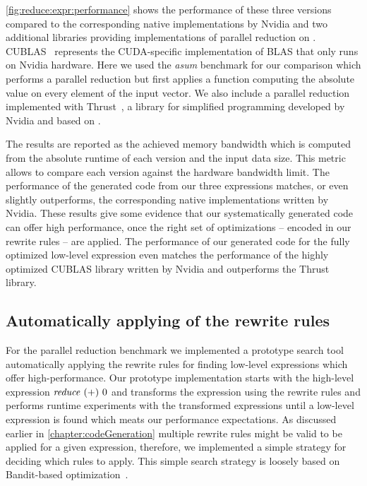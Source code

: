 \autoref{fig:reduce:expr:performance} shows the performance of these three versions compared to the corresponding native \OpenCL implementations by Nvidia and two additional libraries providing implementations of parallel reduction on \GPUs.
CUBLAS~\cite{cuBLAS} represents the CUDA-specific implementation of BLAS that only runs on Nvidia hardware.
Here we used the \emph{asum} benchmark for our comparison which performs a parallel reduction but first applies a function computing the absolute value on every element of the input vector.
We also include a parallel reduction implemented with Thrust~\cite{BellHo2011}, a library for simplified \GPU programming developed by Nvidia and based on \CUDA.

The results are reported as the achieved memory bandwidth which is computed from the absolute runtime of each version and the input data size.
This metric allows to compare each version against the hardware bandwidth limit.
The performance of the generated \OpenCL code from our three expressions matches, or even slightly outperforms, the corresponding native \OpenCL implementations written by Nvidia.
These results give some evidence that our systematically generated code can offer high performance, once the right set of optimizations -- encoded in our rewrite rules -- are applied.
The performance of our generated code for the fully optimized low-level expression even matches the performance of the highly optimized CUBLAS library written by Nvidia and outperforms the Thrust library.

\subsection{Automatically applying of the rewrite rules}
\label{sec:codeGeneration-evaluation:automatic}

For the parallel reduction benchmark we implemented a prototype search tool automatically applying the rewrite rules for finding low-level expressions which offer high-performance.
Our prototype implementation starts with the high-level expression $\text{\textit{reduce}}\ (+)\ 0$ and transforms the expression using the rewrite rules and performs runtime experiments with the transformed expressions until a low-level \OpenCL expression is found which meats our performance expectations.
As discussed earlier in \autoref{chapter:codeGeneration} multiple rewrite rules might be valid to be applied for a given expression, therefore, we implemented a simple strategy for deciding which rules to apply.
This simple search strategy is loosely based on Bandit-based optimization~\cite{MesmayRVP09}.

